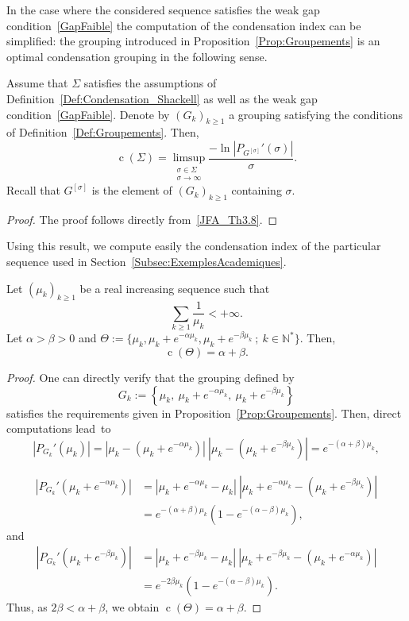 \documentclass[AHL,Unicode,longabstracts]{cedram}
\newcommand{\N}{\mathbb{N}}
\DeclareMathOperator{\cond}{c}
\begin{document}
In the case where the considered sequence satisfies the weak gap condition~\eqref{GapFaible} the computation of the condensation index can be simplified: the grouping introduced in Proposition~\ref{Prop:Groupements} is an optimal condensation grouping in the following sense.

\begin{prop}\label{Prop:CondensationGapParBloc}
Assume that $\Sigma$ satisfies the assumptions of Definition~\ref{Def:Condensation_Shackell} as well as the weak gap condition~\eqref{GapFaible}. Denote by $(G_k)_{k \geq 1}$ a grouping satisfying the conditions of Definition~\ref{Def:Groupements}. Then,
\[
\cond(\Sigma) = \limsup_{\substack{\sigma \in \Sigma \\ \sigma \to \infty}} \frac{- \ln |P_{G^{[\sigma]}}'(\sigma)| }{\sigma}.
\]
Recall that $G^{[\sigma]}$ is the element of $(G_k)_{k \geq 1}$ containing $\sigma$.
\end{prop}


\begin{proof}
The proof follows directly from~\eqref{JFA_Th3.8}.
\end{proof}


Using this result, we compute easily the condensation index of the particular sequence used in Section~\ref{Subsec:ExemplesAcademiques}.
\begin{prop}
Let $(\mu_k)_{k \geq 1}$ be a real increasing sequence such that
\[
\sum_{k \geq 1} \frac{1}{\mu_k} < + \infty.
\]
Let $\alpha >\beta >0$ and $\Theta := \{ \mu_k, \mu_k + e^{-\alpha \mu_k}, \mu_k + e^{-\beta \mu_k} \: ; \: k \in \N^* \}$. Then,
\[
\cond(\Theta) = \alpha + \beta.
\]
\end{prop}

\begin{proof}
One can directly verify that the grouping defined by
\[
G_k := \left\{ \mu_k, \: \mu_k + e^{-\alpha \mu_k}, \: \mu_k + e^{-\beta \mu_k} \right\}
\]
satisfies the requirements given in Proposition~\ref{Prop:Groupements}. Then, direct computations lead~to
\[
\left|P_{G_k}'(\mu_k)\right| = \left|\mu_k - \left(\mu_k + e^{-\alpha \mu_k}\right)\right| \: \left| \mu_k - \left(\mu_k + e^{-\beta \mu_k}\right)\right| = e^{-(\alpha+\beta) \mu_k},
\]


\begin{align*}
\left|P_{G_k}'\left(\mu_k+ e^{-\alpha \mu_k}\right)\right| &= \left|\mu_k+ e^{-\alpha \mu_k}- \mu_k\right| \: \left| \mu_k+ e^{-\alpha \mu_k} - \left(\mu_k + e^{-\beta \mu_k}\right)\right|
\\
&= e^{-(\alpha+\beta) \mu_k} \left(1 - e^{-(\alpha-\beta)\mu_k} \right),
\end{align*}
and
\begin{align*}
\left|P_{G_k}'\left(\mu_k+ e^{-\beta \mu_k}\right)\right| &= \left|\mu_k+ e^{-\beta \mu_k}- \mu_k\right| \: \left| \mu_k+ e^{-\beta \mu_k} - \left(\mu_k + e^{-\alpha \mu_k}\right)\right|
\\
&= e^{-2\beta \mu_k} \left(1 - e^{-(\alpha-\beta)\mu_k} \right).
\end{align*}
Thus, as $2 \beta < \alpha+ \beta$, we obtain $\cond(\Theta) = \alpha + \beta$.
\end{proof}




\end{document}
